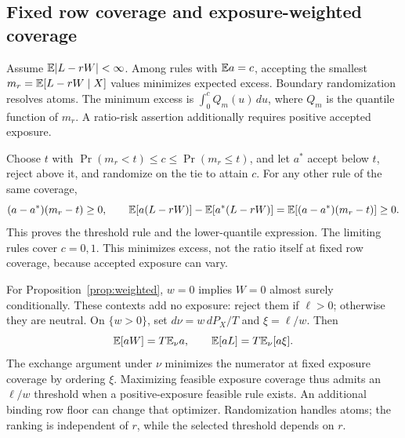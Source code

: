 \subsection{Fixed row coverage and exposure-weighted coverage}
\begingroup
\renewcommand{\theproposition}{1}
\renewcommand{\theHproposition}{threshold}
\begin{proposition}
\label{prop:threshold}
Assume $\mathbb{E}|L-rW|<\infty$. Among rules with $\mathbb{E} a=c$, accepting
the smallest $m_r=\mathbb{E}[L-rW\mid X]$ values minimizes expected excess.
Boundary randomization resolves atoms. The minimum excess is
$\int_0^cQ_m(u)\,du$, where $Q_m$ is the quantile function of $m_r$.
A ratio-risk assertion additionally requires positive accepted exposure.
\end{proposition}
\endgroup
\addtocounter{proposition}{-1}
Choose $t$ with $\Pr(m_r<t)\leq c\leq\Pr(m_r\leq t)$, and let
$a^*$ accept below $t$, reject above it, and randomize on the tie
to attain $c$. For any other rule of the same coverage,
\[
 (a-a^*)(m_r-t)\geq0,\qquad
 \mathbb{E}[a(L-rW)]-\mathbb{E}[a^*(L-rW)]
 =\mathbb{E}[(a-a^*)(m_r-t)]\geq0.
\]
This proves the threshold rule and the lower-quantile expression.
The limiting rules cover $c=0,1$. This minimizes excess, not the
ratio itself at fixed row coverage, because accepted exposure can vary.

For Proposition~\ref{prop:weighted}, $w=0$ implies $W=0$ almost
surely conditionally. These contexts add no exposure: reject them
if $\ell>0$; otherwise they are neutral. On $\{w>0\}$, set
$d\nu=w\,dP_X/T$ and $\xi=\ell/w$. Then
\[
 \mathbb{E}[aW]=T\mathbb{E}_\nu a,\qquad \mathbb{E}[aL]=T\mathbb{E}_\nu[a\xi].
\]
The exchange argument under $\nu$ minimizes the numerator at fixed
exposure coverage by ordering $\xi$. Maximizing feasible exposure
coverage thus admits an $\ell/w$ threshold when a positive-exposure
feasible rule exists. An additional binding row floor can change
that optimizer. Randomization handles atoms; the ranking is
independent of $r$, while the selected threshold depends on $r$.
